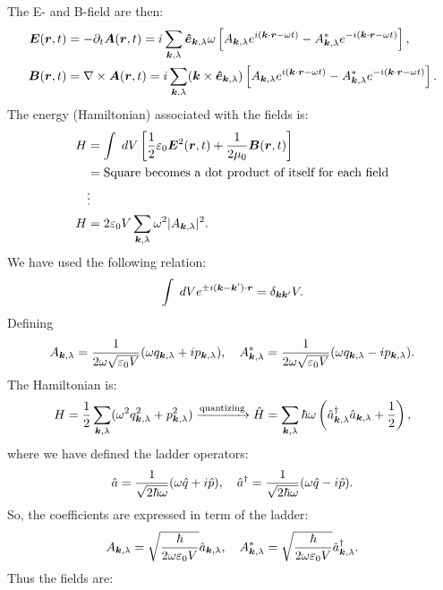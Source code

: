 The E- and B-field are then:
\begin{align*}
    \bm{E}(\bm{r},t)&=-\partial_t\bm{A}(\bm{r},t)=i\sum_{\bm{k},\lambda}\bm{\hat{e}}_{\bm{k},\lambda}\omega\left[A_{\bm{k},\lambda}e^{i(\bm{k}\cdot\bm{r}-\omega t)}-A^*_{\bm{k},\lambda}e^{-i(\bm{k}\cdot\bm{r}-\omega t)}\right],\\
    \bm{B}(\bm{r},t)&=\nabla\times\bm{A}(\bm{r},t)=i\sum_{\bm{k},\lambda}(\bm{k}\times\bm{\hat{e}}_{\bm{k},\lambda})\left[A_{\bm{k},\lambda}e^{i(\bm{k}\cdot\bm{r}-\omega t)}-A^*_{\bm{k},\lambda}e^{-i(\bm{k}\cdot\bm{r}-\omega t)}\right].
\end{align*}
The energy (Hamiltonian) associated with the fields is:
\begin{align*}
    H&=\int\;dV\left[\frac{1}{2}\varepsilon_0\bm{E}^2(\bm{r},t)+\frac{1}{2\mu_0}\bm{B}(\bm{r},t)\right]\\
    &=\text{Square becomes a dot product of itself for each field}\\
    &\vdots\\
    H&=2\varepsilon_0V\sum_{\bm{k},\lambda}\omega^2|A_{\bm{k},\lambda}|^2.
\end{align*}
We have used the following relation:
\begin{align*}
    \int\;dVe^{\pm i(\bm{k}-\bm{k}')\cdot\bm{r}}=\delta_{\bm{k}\bm{k}'}V.
\end{align*}
Defining 
\begin{align*}
    A_{\bm{k},\lambda}=\frac{1}{2\omega\sqrt{\varepsilon_0V}}(\omega q_{\bm{k},\lambda}+ip_{\bm{k},\lambda}),\quad
    A^*_{\bm{k},\lambda}=\frac{1}{2\omega\sqrt{\varepsilon_0V}}(\omega q_{\bm{k},\lambda}-ip_{\bm{k},\lambda}).
\end{align*}
The Hamiltonian is:
\begin{align*}
    H=\frac{1}{2}\sum_{\bm{k},\lambda}(\omega^2q^2_{\bm{k},\lambda}+p^2_{\bm{k},\lambda})\xrightarrow{\text{quantizing}}\hat{H}=\sum_{\bm{k},\lambda}\hbar\omega\left(\hat{a}^\dagger_{\bm{k},\lambda}
    \hat{a}_{\bm{k},\lambda}+\frac{1}{2}\right),
\end{align*}
where we have defined the ladder operators:
\begin{align}
    \hat{a}=\frac{1}{\sqrt{2\hbar\omega}}(\omega\hat{q}+i\hat{p}),\quad\hat{a}^\dagger=\frac{1}{\sqrt{2\hbar\omega}}(\omega\hat{q}-i\hat{p}).
\end{align}
So, the coefficients are expressed in term of the ladder:
\begin{align*}
    A_{\bm{k},\lambda}=\sqrt{\frac{\hbar}{2\omega\varepsilon_0V}}\hat{a}_{\bm{k},\lambda},\quad A^*_{\bm{k},\lambda}=\sqrt{\frac{\hbar}{2\omega\varepsilon_0V}}\hat{a}^\dagger_{\bm{k},\lambda}.
\end{align*}
Thus the fields are:
